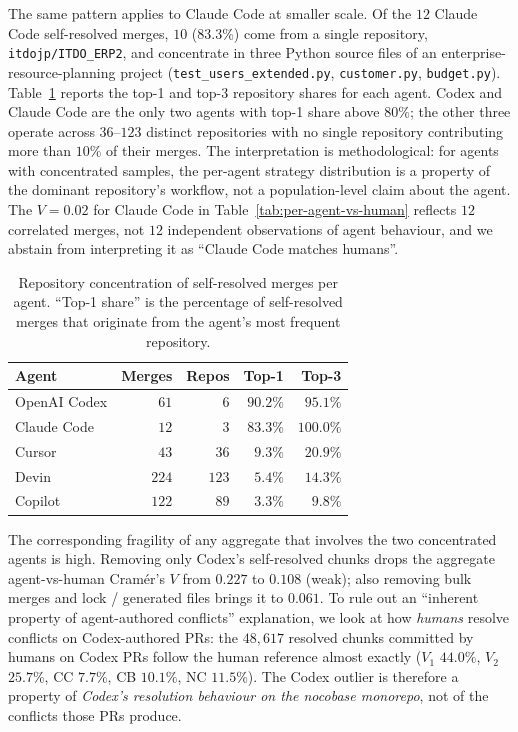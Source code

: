 \documentclass[sigconf,anonymous]{acmart}
\begin{document}
The same pattern applies to Claude Code at smaller scale. Of the $12$ Claude Code self-resolved merges, $10$ ($83.3\%$) come from a single repository, \texttt{itdojp/ITDO\_ERP2}, and concentrate in three Python source files of an enterprise-resource-planning project \linebreak (\texttt{test\_users\_extended.py}, \texttt{customer.py}, \texttt{budget.py}). Table~\ref{tab:repo-concentration} reports the top-1 and top-3 repository shares for each agent. Codex and Claude Code are the only two agents with top-1 share above $80\%$; the other three operate across $36$--$123$ distinct repositories with no single repository contributing more than $10\%$ of their merges. The interpretation is methodological: for agents with concentrated samples, the per-agent strategy distribution is a property of the dominant repository's workflow, not a population-level claim about the agent. The $V{=}0.02$ for Claude Code in Table~\ref{tab:per-agent-vs-human} reflects $12$ correlated merges, not $12$ independent observations of agent behaviour, and we abstain from interpreting it as ``Claude Code matches humans''.

\begin{table}
  \caption{Repository concentration of self-resolved merges per agent. ``Top-1 share'' is the percentage of self-resolved merges that originate from the agent's most frequent repository.}
  \label{tab:repo-concentration}
  \small\setlength{\tabcolsep}{4pt}
  \begin{tabular}{lrrrr}
    \toprule
    Agent & Merges & Repos & Top-1 & Top-3 \\
    \midrule
    OpenAI Codex & $61$  & $6$   & $90.2\%$ & $95.1\%$ \\
    Claude Code  & $12$  & $3$   & $83.3\%$ & $100.0\%$ \\
    Cursor       & $43$  & $36$  & $9.3\%$  & $20.9\%$ \\
    Devin        & $224$ & $123$ & $5.4\%$  & $14.3\%$ \\
    Copilot      & $122$ & $89$  & $3.3\%$  & $9.8\%$  \\
    \bottomrule
  \end{tabular}
\end{table}

The corresponding fragility of any aggregate that involves the two concentrated agents is high. Removing only Codex's \linebreak self-resolved chunks drops the aggregate agent-vs-human Cram\'{e}r's $V$ from $0.227$ to $0.108$ (weak); also removing bulk merges and \linebreak lock / generated files brings it to $0.061$. To rule out an ``inherent property of agent-authored conflicts'' explanation, we look at how \emph{humans} resolve conflicts on Codex-authored PRs: the $48{,}617$ resolved chunks committed by humans on Codex PRs follow the human reference almost exactly ($V_1$ $44.0\%$, $V_2$ $25.7\%$, CC $7.7\%$, CB $10.1\%$, NC $11.5\%$). The Codex outlier is therefore a property of \emph{Codex's resolution behaviour on the nocobase monorepo}, not of the conflicts those PRs produce.
\end{document}

